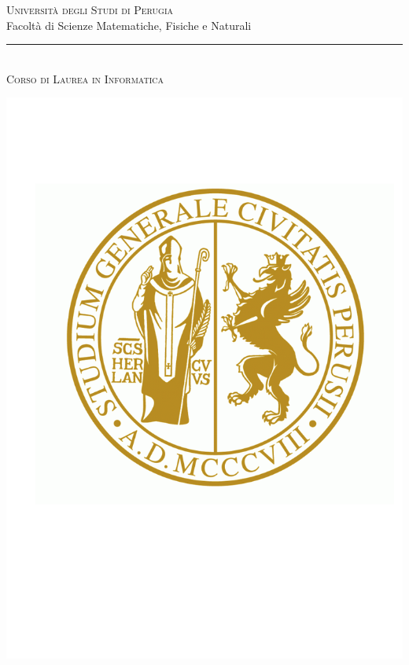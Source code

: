 \documentclass[a4paper,12pt]{report}
\title{\begin{large}\textbf{\titolotesi}\end{large}}
\author{\laureando}
\begin{document}
\begin{titlepage}
 \begin{center}
\textsc{\Large Universit\`a degli Studi di Perugia}\medskip\\

{\Large Facolt\`a di Scienze Matematiche, Fisiche e Naturali}\medskip\\

\rule{10mm}{0.01mm}\medskip\\

{\small \textsc{Corso di Laurea in Informatica}}\medskip\\


\vspace*{3mm}

\includegraphics[scale=0.35]{images/logounipg.png}


\end{center}
\end{titlepage}
\end{document}
